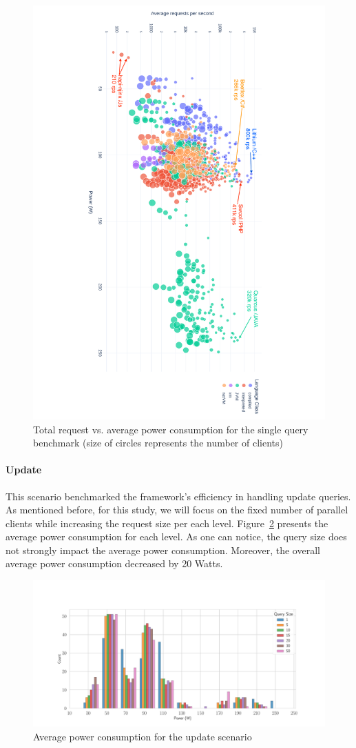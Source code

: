 \begin{figure}[hbt]
    \includegraphics[height=\textwidth,width=\textheight,keepaspectratio,angle=90]{imgs/power_requests_query_log}
    \caption{Total request vs. average power consumption for the single query benchmark (size of circles represents the number of clients) }
    \label{fig:power_requests_query}
\end{figure}

\paragraph{Update}
This scenario benchmarked the framework's efficiency in handling update queries.
As mentioned before, for this study, we will focus on the fixed number of parallel clients while increasing the request size per each level.
Figure~\ref{fig:av_power_update} presents the average power consumption for each level.
As one can notice, the query size does not strongly impact the average power consumption.
Moreover, the overall average power consumption decreased by 20 Watts.

\begin{figure}[hbt]
    \centering
    \includegraphics[width=\textwidth,height=\textheight,keepaspectratio]{imgs/histogram_av_power_cpu_update}
    \caption{Average power consumption for the update scenario}
    \label{fig:av_power_update}
\end{figure}

